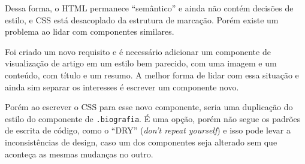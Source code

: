 \begin{Shaded}
\begin{Highlighting}[]
\KeywordTok{>} 
    \KeywordTok{>} 
\StringTok{        }\ErrorTok{<}\KeywordTok{>} 
        \KeywordTok{>} 
\end{Highlighting}
\end{Shaded}

Dessa forma, o HTML permanece ``semântico'' e ainda não contém decisões
de estilo, e CSS está desacoplado da estrutura de marcação. Porém existe
um problema ao lidar com componentes similares.

Foi criado um novo requisito e é necessário adicionar um componente de
visualização de artigo em um estilo bem parecido, com uma imagem e um
conteúdo, com título e um resumo. A melhor forma de lidar com essa
situação e ainda sim separar os interesses é escrever um componente
novo.

\begin{Shaded}
\begin{Highlighting}[]
\KeywordTok{>} 
    \KeywordTok{>} 
\StringTok{        }\ErrorTok{<}\KeywordTok{>} 
        \KeywordTok{>} 
\end{Highlighting}
\end{Shaded}

Porém ao escrever o CSS para esse novo componente, seria uma duplicação
do estilo do componente de \texttt{.biografia}. É uma opção, porém não
segue os padrões de escrita de código, como o ``DRY'' (\emph{don't
repeat yourself}) e isso pode levar a inconsistências de design, caso um
dos componentes seja alterado sem que aconteça as mesmas mudanças no
outro.

